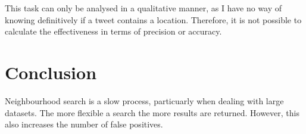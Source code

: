 \documentclass[a4paper]{article}
\begin{document}
This task can only be analysed in a qualitative manner, as I have no way of knowing definitively if a tweet contains a location. Therefore, it is not possible to calculate the effectiveness in terms of precision or accuracy.

\section{Conclusion}
Neighbourhood search is a slow process, particuarly when dealing with large datasets. The more flexible a search the more results are returned. However, this also increases the number of false positives.
\end{document}
